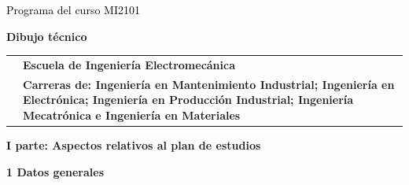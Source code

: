\documentclass[letterpaper]{article}%
\begin{document}
%
\normalsize%
\thispagestyle{empty}%
%
\vspace*{150mm}%
\par\fontsize{14}{0}\selectfont \textcolor{black}{Programa del curso MI2101}%
\par\fontsize{18}{25}\selectfont \textbf{\textcolor{azulsuaveTEC}{Dibujo técnico}}%
\begin{tabularx}{\textwidth}{m{}m{}}%
&\hspace*{0mm}\fontsize{12}{14}\selectfont \textbf{\textcolor{gris}{Escuela de Ingeniería Electromecánica}}\\%
[-4pt]%
&\hspace*{0mm}\fontsize{12}{14}\selectfont \textbf{\textcolor{gris}{Carreras de: Ingeniería en Mantenimiento Industrial; Ingeniería en Electrónica; Ingeniería en Producción Industrial; Ingeniería Mecatrónica e Ingeniería en Materiales}}\\%
\end{tabularx}%
\newpage%
\pagestyle{headfoot}%
\par\fontsize{14}{0}\selectfont \textbf{\textcolor{parte}{I parte: Aspectos relativos al plan de estudios}}%
\par\hspace*{4mm}\fontsize{12}{20}\selectfont \textbf{\textcolor{parte}{1 Datos generales}}%
\end{document}
